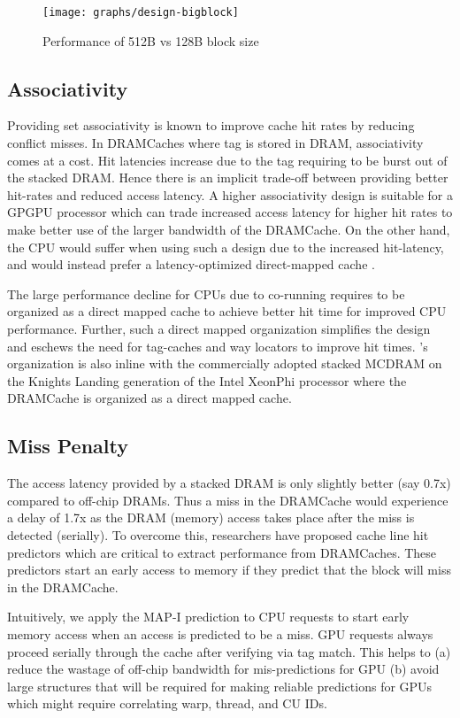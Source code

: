 \begin{figure}[htbp]
   \centering
   \texttt{[image: graphs/design-bigblock]}
   \caption{Performance of 512B vs 128B block size}	
   \label{fig:design-bigblock}
\end{figure}

\subsection{Associativity} 
Providing set associativity is known to improve cache hit rates by reducing conflict misses. In DRAMCaches where tag is stored in DRAM,  associativity comes at a cost. Hit latencies increase due to the tag requiring to be burst out of the stacked DRAM. Hence there is an implicit trade-off between providing better hit-rates and reduced access latency. A higher associativity design is suitable for a GPGPU processor which can trade increased access latency for higher hit rates to make better use of the larger bandwidth of the DRAMCache. On the other hand, the CPU would suffer when using such a design due to the increased hit-latency, and  would instead prefer a latency-optimized direct-mapped cache \cite{alloy}.
\par The large performance decline for CPUs due to co-running requires \cachename to be organized as a direct mapped cache to achieve better hit time for improved CPU performance. Further, such a direct mapped organization simplifies the design and eschews the need for tag-caches \cite{atcache} and way locators \cite{bimodal} to improve hit times. \cachename's organization is also inline with the commercially adopted stacked MCDRAM on the Knights Landing generation of the Intel XeonPhi processor \cite{xeonphi} where the DRAMCache is organized as a direct mapped cache.

\subsection{Miss Penalty}
The access latency provided by a stacked DRAM is only slightly better (say 0.7x) compared to off-chip DRAMs. Thus a miss in the DRAMCache would experience a delay of 1.7x as the DRAM (memory) access takes place after the miss is detected (serially). To overcome this, researchers have proposed cache line hit predictors \cite{loh-hill,alloy} which are critical to extract performance from DRAMCaches. These predictors start an early access to memory if they predict that the block will miss in the DRAMCache. 
\par Intuitively, we apply the MAP-I prediction \cite{alloy} to CPU requests to start early memory access when an access is predicted to be a miss. GPU requests always proceed serially through the cache after verifying via tag match. This helps to (a) reduce the wastage of off-chip bandwidth for mis-predictions for GPU (b) avoid large structures that will be required for making reliable predictions for GPUs which might require correlating warp, thread, and CU IDs.

